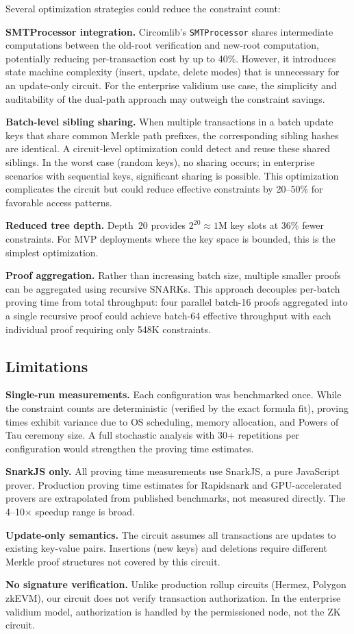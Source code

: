 Several optimization strategies could reduce the constraint count:

\textbf{SMTProcessor integration.} Circomlib's \texttt{SMTProcessor}
shares intermediate computations between the old-root verification and
new-root computation, potentially reducing per-transaction cost by
up to 40\%. However, it introduces state machine complexity (insert,
update, delete modes) that is unnecessary for an update-only circuit.
For the enterprise validium use case, the simplicity and auditability
of the dual-path approach may outweigh the constraint savings.

\textbf{Batch-level sibling sharing.} When multiple transactions in a
batch update keys that share common Merkle path prefixes, the
corresponding sibling hashes are identical. A circuit-level optimization
could detect and reuse these shared siblings. In the worst case (random
keys), no sharing occurs; in enterprise scenarios with sequential keys,
significant sharing is possible. This optimization complicates the circuit
but could reduce effective constraints by 20--50\% for favorable
access patterns.

\textbf{Reduced tree depth.} Depth~20 provides $2^{20} \approx 1$M
key slots at 36\% fewer constraints. For MVP deployments where the
key space is bounded, this is the simplest optimization.

\textbf{Proof aggregation.} Rather than increasing batch size, multiple
smaller proofs can be aggregated using recursive SNARKs. This approach
decouples per-batch proving time from total throughput: four parallel
batch-16 proofs aggregated into a single recursive proof could achieve
batch-64 effective throughput with each individual proof requiring only
548K constraints.

\subsection{Limitations}

\textbf{Single-run measurements.} Each configuration was benchmarked
once. While the constraint counts are deterministic (verified by the
exact formula fit), proving times exhibit variance due to OS scheduling,
memory allocation, and Powers of Tau ceremony size. A full stochastic
analysis with 30+ repetitions per configuration would strengthen the
proving time estimates.

\textbf{SnarkJS only.} All proving time measurements use SnarkJS, a
pure JavaScript prover. Production proving time estimates for Rapidsnark
and GPU-accelerated provers are extrapolated from published benchmarks,
not measured directly. The 4--10$\times$ speedup range is broad.

\textbf{Update-only semantics.} The circuit assumes all transactions
are updates to existing key-value pairs. Insertions (new keys) and
deletions require different Merkle proof structures not covered by
this circuit.

\textbf{No signature verification.} Unlike production rollup circuits
(Hermez, Polygon zkEVM), our circuit does not verify transaction
authorization. In the enterprise validium model, authorization is
handled by the permissioned node, not the ZK circuit.
